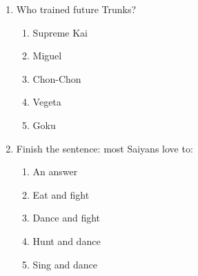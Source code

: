 \documentclass[letterpaper,addpoints,answers,twocolumn,10pt]{exam}
\begin{document}
\begin{enumerate}[leftmargin=.2in]
\begin{enumerate}[noitemsep,leftmargin=0in]
\end{enumerate}



\item  Who trained future Trunks?


\begin{enumerate}[noitemsep,leftmargin=0in]


\item  Supreme Kai
\item  Miguel
\item  Chon-Chon
\item  Vegeta
\item  Goku


\end{enumerate}



\item  Finish the sentence: most Saiyans love to:


\begin{enumerate}[noitemsep,leftmargin=0in]


\item  An answer
\item  Eat and fight
\item  Dance and fight
\item  Hunt and dance
\item  Sing and dance


\end{enumerate}



\end{enumerate}
\end{document}
